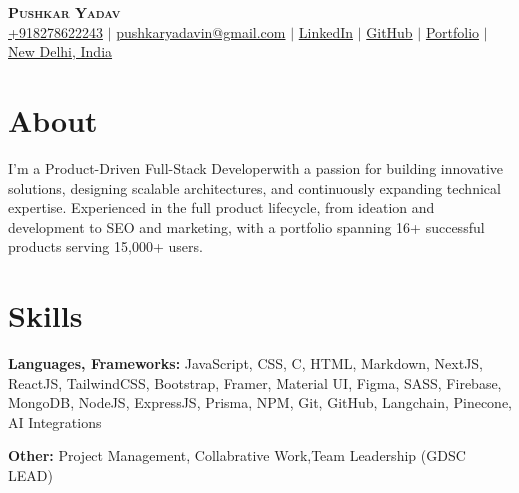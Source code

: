 \documentclass[letterpaper,11pt]{article}
\newcommand{\resumeSubHeadingListStart}{\begin{itemize}[leftmargin=0.15in, label={}]}
\newcommand{\resumeSubHeadingListEnd}{\end{itemize}}
\begin{document}

\begin{center}
    \textbf{\Huge \scshape Pushkar Yadav} \\ \vspace{3pt}
    \small
    \faMobile \hspace{.5pt} \href{tel:918278622243}{+918278622243}
    $|$
    \faAt \hspace{.5pt} \href{mailto:pushkaryadavin@gmail.com}{pushkaryadavin@gmail.com}
    $|$
    \faLinkedinSquare \hspace{.5pt} \href{https://www.linkedin.com/in/pushkarydv/}{LinkedIn}
    $|$
    \faGithub \hspace{.5pt} \href{http://github.com/pushkarydv}{GitHub}
    $|$
    \faGlobe \hspace{.5pt} \href{https://pushkaryadav.in}{Portfolio}
    $|$
    \faMapMarker \hspace{.5pt} \href{https://www.google.com/maps/place/new+delhi+india/data=!4m2!3m1!1s0x390cfd5b347eb62d:0x52c2b7494e204dce?sa=X&ved=1t:155783&ictx=111}{New Delhi, India}
\end{center}


\section{About}
  \vspace{2pt}
  \resumeSubHeadingListStart
    \small{\item{

        \textbf{}{ I'm a Product-Driven Full-Stack Developerwith a passion for building innovative solutions, designing scalable architectures, and continuously expanding technical expertise. Experienced in the full product lifecycle, from ideation and development to SEO and marketing, with a portfolio spanning 16+ successful products serving 15,000+ users.
        }

    }}
    \resumeSubHeadingListEnd




\section{Skills}
  \vspace{2pt}
  \resumeSubHeadingListStart
    \small{\item{
    
       
         \textbf{Languages, Frameworks:}{ JavaScript, CSS, C, HTML, Markdown, NextJS, ReactJS, TailwindCSS, Bootstrap, Framer, Material UI, Figma, SASS, Firebase, MongoDB, NodeJS, ExpressJS, Prisma, NPM, Git, GitHub, Langchain, Pinecone, AI Integrations} \\ \vspace{3pt}
        
        \textbf{Other:}{ Project Management, Collabrative Work,Team Leadership (GDSC LEAD) } \\ \vspace{3pt}
        
        
    }}
  \resumeSubHeadingListEnd
\end{document}
